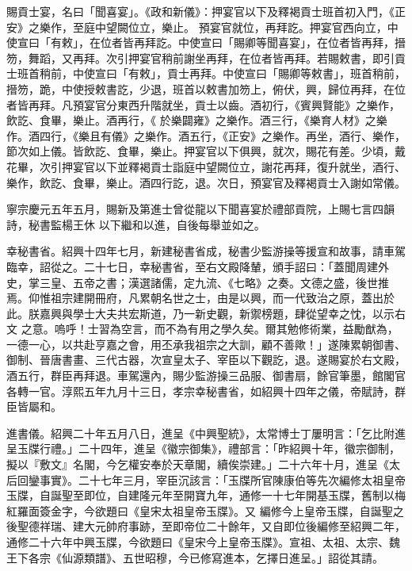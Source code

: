 \begin{pinyinscope}
 賜貢士宴，名曰「聞喜宴」。《政和新儀》：押宴官以下及釋褐貢士班首初入門，《正安》之樂作，至庭中望闕位立，樂止。
 預宴官就位，再拜訖。押宴官西向立，中使宣曰「有敕」，在位者皆再拜訖。中使宣曰「賜卿等聞喜宴」，在位者皆再拜，搢笏，舞蹈，又再拜。次引押宴官稍前謝坐再拜，在位者皆再拜。若賜敕書，即引貢士班首稍前，中使宣曰「有敕」，貢士再拜。中使宣曰「賜卿等敕書」，班首稍前，搢笏，跪，中使授敕書訖，少退，班首以敕書加笏上，俯伏，興，歸位再拜，在位者皆再拜。凡預宴官分東西升階就坐，貢士以齒。酒初行，《賓興賢能》之樂作，飲訖、食畢，樂止。酒再行，《
 於樂闢雍》之樂作。酒三行，《樂育人材》之樂作。酒四行，《樂且有儀》之樂作。酒五行，《正安》之樂作。再坐，酒行、樂作，節次如上儀。皆飲訖、食畢，樂止。押宴官以下俱興，就次，賜花有差。少頃，戴花畢，次引押宴官以下並釋褐貢士詣庭中望闕位立，謝花再拜，復升就坐，酒行、樂作，飲訖、食畢，樂止。酒四行訖，退。次日，預宴官及釋褐貢士入謝如常儀。



 寧宗慶元五年五月，賜新及第進士曾從龍以下聞喜宴於禮部貢院，上賜七言四韻詩，秘書監楊王休
 以下繼和以進，自後每舉並如之。



 幸秘書省。紹興十四年七月，新建秘書省成，秘書少監游操等援宣和故事，請車駕臨幸，詔從之。二十七日，幸秘書省，至右文殿降輦，頒手詔曰：「蓋聞周建外史，掌三皇、五帝之書；漢選諸儒，定九流、《七略》之奏。文德之盛，後世推焉。仰惟祖宗建開冊府，凡累朝名世之士，由是以興，而一代致治之原，蓋出於此。朕嘉興與學士大夫共宏斯道，乃一新史觀，新禦榜題，肆從望幸之忱，以示右文
 之意。嗚呼！士習為空言，而不為有用之學久矣。爾其勉修術業，益勵猷為，一德一心，以共赴亨嘉之會，用丕承我祖宗之大訓，顧不善歟！」遂陳累朝御書、御制、晉唐書畫、三代古器，次宣皇太子、宰臣以下觀訖，退。遂賜宴於右文殿，酒五行，群臣再拜退。車駕還內，賜少監游操三品服、御書扇，餘官筆墨，館閣官各轉一官。淳熙五年九月十三日，孝宗幸秘書省，如紹興十四年之儀，帝賦詩，群臣皆屬和。



 進書儀。紹興二十年五月八日，進呈《中興聖統》，太常博士丁屢明言：「乞比附進呈玉牒行禮。」二十四年，進呈《徽宗御集》，禮部言：「昨紹興十年，徽宗御制，擬以『敷文』名閣，今乞權安奉於天章閣，續俟崇建。」二十六年十月，進呈《太后回鑾事實》。二十七年三月，宰臣沉該言：「玉牒所官陳康伯等先次編修太祖皇帝玉牒，自誕聖至即位，自建隆元年至開寶九年，通修一十七年開基玉牒，舊制以梅紅羅面簽金字，今欲題曰《皇宋太祖皇帝玉牒》。又
 編修今上皇帝玉牒，自誕聖之後聖德祥瑞、建大元帥府事跡，至即帝位二十餘年，又自即位後編修至紹興二年，通修二十六年中興玉牒，今欲題曰《皇宋今上皇帝玉牒》。宣祖、太祖、太宗、魏王下各宗《仙源類譜》、五世昭穆，今已修寫進本，乞擇日進呈。」詔從其請。




\end{pinyinscope}
